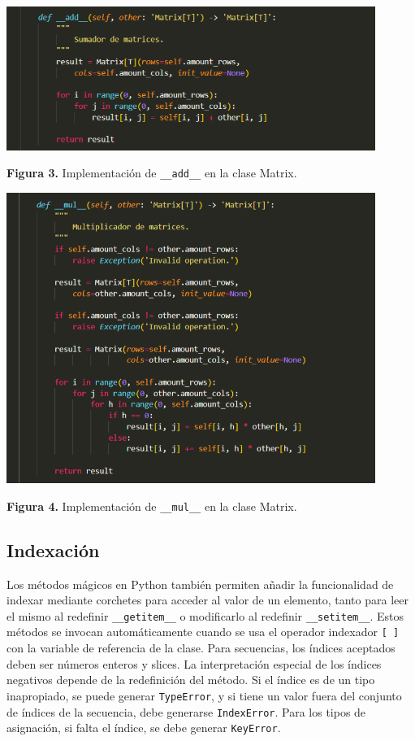 \documentclass[10pt]{article} %
\newcommand{\csl}[1]{\colorbox{backcolour}{\texttt{#1}}}
\newcommand{\imgcaption}[2]{\tiny \textbf{Figura #1.} #2.}
\newcommand{\mgc}[2][]{\colorbox{backcolour}{\texttt{\_\_#2\_\_#1}}}
\newcommand{\mgccapt}[1]{\texttt{\_\_#1\_\_}}
\begin{document}
\begin{center}
	\includegraphics[width=12cm]{add.png} 
	
	\imgcaption{3}{Implementaci\'on de \mgccapt{add} en la clase Matrix}
\end{center}

\begin{center}
	\includegraphics[width=12cm]{mul.png}
	
	\imgcaption{4}{Implementaci\'on de \mgccapt{mul} en la clase Matrix}
\end{center}

\subsection{Indexaci\'on}
Los m\'etodos m\'agicos en Python tambi\'en permiten a\~nadir la funcionalidad de indexar mediante corchetes para acceder al valor de un elemento, tanto para leer el mismo al redefinir \mgc{getitem} o modificarlo al redefinir \mgc{setitem}. Estos m\'etodos se invocan automáticamente cuando se usa el operador indexador \csl{[ ]} con la variable de referencia de la clase. Para secuencias, los \'indices aceptados deben ser números enteros y slices. La interpretación especial de los índices negativos depende de la redefinici\'on del método. Si el \'indice es de un tipo inapropiado, se puede generar \csl{TypeError}, y si tiene un valor fuera del conjunto de índices de la secuencia, debe generarse \csl{IndexError}. Para los tipos de asignación, si falta el \'indice, se debe generar \csl{KeyError}.
\end{document}

